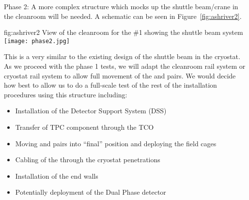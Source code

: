 Phase 2: A more complex structure which mocks up the shuttle
beam/crane in the cleanroom will be needed. A schematic can be seen in
Figure~\ref{fig:ashriver2}.
\begin{dunefigure}{fig:ashriver2}
  {View of the cleanroom for the  \#1 showing the
    shuttle beam system}
  \texttt{[image: phase2.jpg]}
\end{dunefigure}
This is a very similar to the existing design of the shuttle beam in
the cryostat.  As we proceed with the phase 1 tests, we will adapt the
cleanroom rail system or cryostat rail system to allow full movement
of the  and  pairs. We would decide how best to
allow us to do a full-scale test of the rest of the installation
procedures using this structure including:
\begin{itemize}
 \item Installation of the Detector Support System (DSS)
 \item Transfer of TPC component through the TCO
 \item Moving  and  pairs into ``final'' position and deploying the field cages
 \item Cabling of the  through the cryostat penetrations
 \item Installation of the end walls
 \item Potentially deployment of the Dual Phase detector
\end{itemize}
